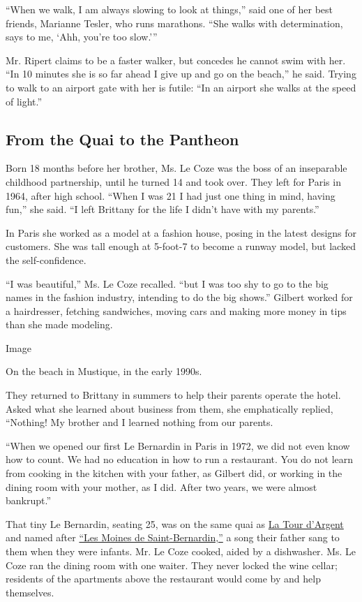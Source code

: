 ``When we walk, I am always slowing to look at things,'' said one of her
best friends, Marianne Tesler, who runs marathons. ``She walks with
determination, says to me, `Ahh, you're too slow.'''

Mr. Ripert claims to be a faster walker, but concedes he cannot swim
with her. ``In 10 minutes she is so far ahead I give up and go on the
beach,'' he said. Trying to walk to an airport gate with her is futile:
``In an airport she walks at the speed of light.''

\hypertarget{from-the-quai-to-the-pantheon}{%
\subsection{From the Quai to the
Pantheon}\label{from-the-quai-to-the-pantheon}}

Born 18 months before her brother, Ms. Le Coze was the boss of an
inseparable childhood partnership, until he turned 14 and took over.
They left for Paris in 1964, after high school. ``When I was 21 I had
just one thing in mind, having fun,'' she said. ``I left Brittany for
the life I didn't have with my parents.''

In Paris she worked as a model at a fashion house, posing in the latest
designs for customers. She was tall enough at 5-foot-7 to become a
runway model, but lacked the self-confidence.

``I was beautiful,'' Ms. Le Coze recalled. ``but I was too shy to go to
the big names in the fashion industry, intending to do the big shows.''
Gilbert worked for a hairdresser, fetching sandwiches, moving cars and
making more money in tips than she made modeling.

Image

On the beach in Mustique, in the early 1990s.

They returned to Brittany in summers to help their parents operate the
hotel. Asked what she learned about business from them, she emphatically
replied, ``Nothing! My brother and I learned nothing from our parents.

``When we opened our first Le Bernardin in Paris in 1972, we did not
even know how to count. We had no education in how to run a restaurant.
You do not learn from cooking in the kitchen with your father, as
Gilbert did, or working in the dining room with your mother, as I did.
After two years, we were almost bankrupt.''

That tiny Le Bernardin, seating 25, was on the same quai as
\href{https://tourdargent.com/en/}{La Tour d'Argent} and named after
\href{https://www.youtube.com/watch?v=CSrQLHZ6M_c}{``Les Moines de
Saint-Bernardin,''} a song their father sang to them when they were
infants. Mr. Le Coze cooked, aided by a dishwasher. Ms. Le Coze ran the
dining room with one waiter. They never locked the wine cellar;
residents of the apartments above the restaurant would come by and help
themselves.

